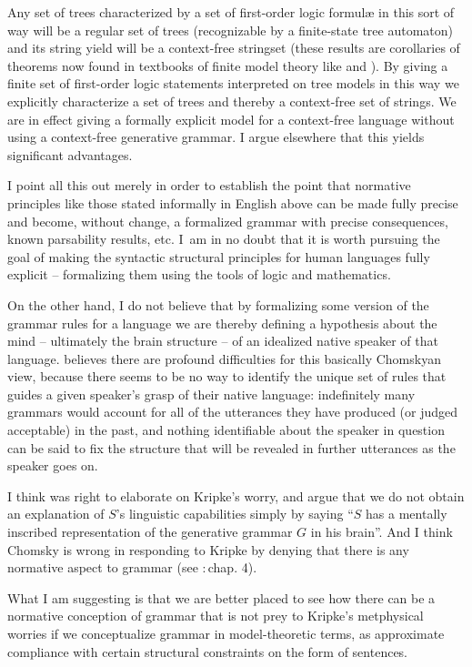 \documentclass[output=paper]{langscibook}
\begin{document}
Any set of trees characterized by a set of first-order logic formul{\ae} in this sort of way will be a regular set of trees (recognizable by a finite-state tree automaton) and its string yield will be a context-free stringset (these results are corollaries of theorems now found in textbooks of finite model theory like \citealt{EbbiFlum99} and \citealt{Libkin04}). By giving a finite set of first-order logic statements interpreted on tree models in this way we explicitly characterize a set of trees and thereby a context-free set of strings.  We are in effect giving a formally explicit model for a context-free language without using a context-free generative grammar.  I argue elsewhere \citep{Pullum13} that this yields significant advantages.

I point all this out merely in order to establish the point that normative principles like those stated informally in English above can be made fully precise and become, without change, a formalized grammar with precise consequences, known parsability results, etc. I~am in no doubt that it is worth pursuing the goal of making the syntactic structural principles for human languages fully explicit -- formalizing them using the tools of logic and mathematics.

On the other hand, I do not believe that by formalizing some version of the grammar rules for a language we are thereby defining a hypothesis about the mind -- ultimately the brain structure -- of an idealized native speaker of that language. \citet{Kripke82} believes there are profound difficulties for this basically Chomskyan view, because there seems to be no way to identify the unique set of rules that guides a given speaker's grasp of their native language: indefinitely many grammars would account for all of the utterances they have produced (or judged acceptable) in the past, and nothing identifiable about the speaker in question can be said to fix the structure that will be revealed in further utterances as the speaker goes on.

I think \citet{Scholz90} was right to elaborate on Kripke's worry, and argue that we do not obtain an explanation of $S$'s linguistic capabilities simply by saying ``$S$ has a mentally inscribed representation of the generative grammar $G$ in his brain''. And I think Chomsky is wrong in responding to Kripke by denying that there is any normative aspect to grammar (see \citealt{Chomsky86KL}:\,chap. 4).

What I am suggesting is that we are better placed to see how there can be a normative conception of grammar that is not prey to Kripke's metphysical worries if we conceptualize grammar in model-theoretic terms, as approximate compliance with certain structural constraints on the form of sentences.
\end{document}
